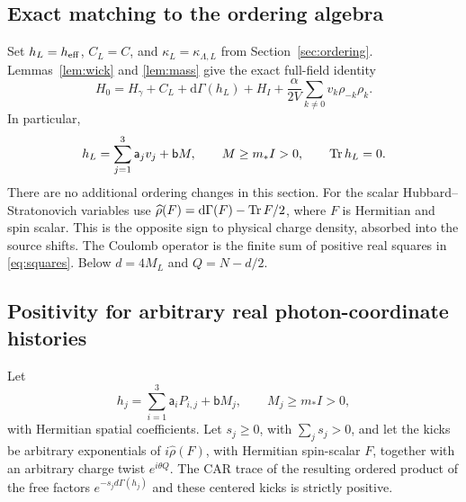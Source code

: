 \subsection{Exact matching to the ordering algebra}
Set \(h_L=h_{\mathrm{eff}}\), \(C_L=C\), and
\(\kappa_L=\kappa_{\Lambda,L}\) from Section~\ref{sec:ordering}.
Lemmas~\ref{lem:wick} and \ref{lem:mass} give the exact full-field identity
\begin{equation}
H_0=H_\gamma+C_L+\mathrm d\Gamma(h_L)+H_I
+\frac\alpha{2V}\sum_{k\ne0}v_k\rho_{-k}\rho_k.
\label{pe-wick}
\end{equation}
In particular,
\begin{equation}
h_L=\sum_{j=1}^3\mathsf a_jv_j+\mathsf b M,
\qquad M\ge m_*I>0,\qquad \operatorname{Tr} h_L=0.
\label{pe-positive-mass}
\end{equation}
There are no additional ordering changes in this section.
For the scalar Hubbard--Stratonovich variables use
\(\widehat\rho(F)=\mathrm d\Gamma(F)-\operatorname{Tr} F/2\),
where \(F\) is Hermitian and spin scalar. This is the opposite
sign to physical charge density, absorbed into the source shifts.
The Coulomb operator is the finite sum of positive real squares
in \eqref{eq:squares}. Below \(d=4M_L\) and \(Q=N-d/2\).

\subsection{Positivity for arbitrary real photon-coordinate histories}

\begin{lemma}
\label{pe-trace-positive}
Let
\[
h_j=\sum_{i=1}^3\mathsf a_i P_{i,j}+\mathsf b M_j,
\qquad M_j\ge m_*I>0,
\]
with Hermitian spatial coefficients. Let \(s_j\ge0\), with
\(\sum_js_j>0\), and let the kicks be arbitrary exponentials of
\(i\widehat\rho(F)\), with Hermitian spin-scalar \(F\), together
with an arbitrary charge twist \(e^{i\theta Q}\). The CAR trace of
the resulting ordered product of the free factors
\(e^{-s_jd\Gamma(h_j)}\) and these centered kicks is strictly positive.
\end{lemma}

